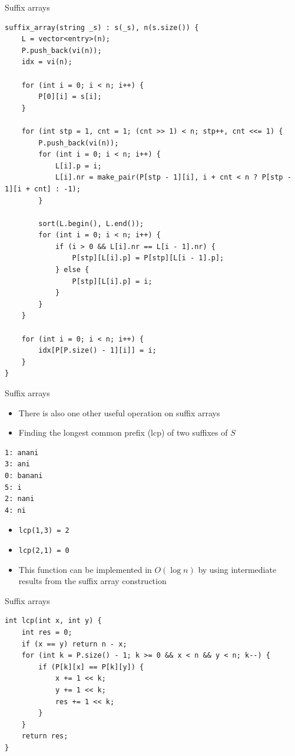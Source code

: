 \documentclass{beamer}
\begin{document}
\begin{frame}[fragile]{Suffix arrays}
    \begin{verbatim}
suffix_array(string _s) : s(_s), n(s.size()) {
    L = vector<entry>(n);
    P.push_back(vi(n));
    idx = vi(n);

    for (int i = 0; i < n; i++) {
        P[0][i] = s[i];
    }

    for (int stp = 1, cnt = 1; (cnt >> 1) < n; stp++, cnt <<= 1) {
        P.push_back(vi(n));
        for (int i = 0; i < n; i++) {
            L[i].p = i;
            L[i].nr = make_pair(P[stp - 1][i], i + cnt < n ? P[stp - 1][i + cnt] : -1);
        }

        sort(L.begin(), L.end());
        for (int i = 0; i < n; i++) {
            if (i > 0 && L[i].nr == L[i - 1].nr) {
                P[stp][L[i].p] = P[stp][L[i - 1].p];
            } else {
                P[stp][L[i].p] = i;
            }
        }
    }

    for (int i = 0; i < n; i++) {
        idx[P[P.size() - 1][i]] = i;
    }
}
\end{verbatim}
\end{frame}

\begin{frame}[fragile]{Suffix arrays}
    \begin{itemize}
        \item There is also one other useful operation on suffix arrays
        \item Finding the longest common prefix (lcp) of two suffixes of $S$
    \end{itemize}

    \begin{verbatim}
1: anani
3: ani
0: banani
5: i
2: nani
4: ni
    \end{verbatim}

    \begin{itemize}
\item \texttt{lcp(1,3) = 2}
\item \texttt{lcp(2,1) = 0}
    \vspace{10pt}
\item This function can be implemented in $O(\log n)$ by using intermediate results from the suffix array construction
    \end{itemize}
\end{frame}

\begin{frame}[fragile]{Suffix arrays}
    \begin{verbatim}
int lcp(int x, int y) {
    int res = 0;
    if (x == y) return n - x;
    for (int k = P.size() - 1; k >= 0 && x < n && y < n; k--) {
        if (P[k][x] == P[k][y]) {
            x += 1 << k;
            y += 1 << k;
            res += 1 << k;
        }
    }
    return res;
}
\end{verbatim}
\end{frame}
\end{document}
